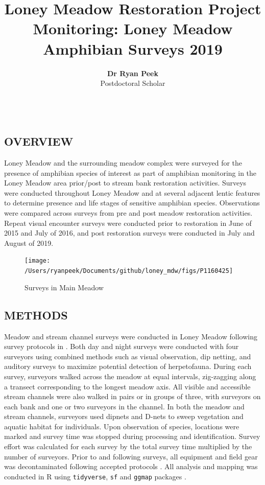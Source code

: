 \documentclass[11pt,a4paper,]{article}
\title{Loney Meadow Restoration Project Monitoring: Loney Meadow Amphibian Surveys 2019}
\author{\sf\Large\textbf{ Dr Ryan Peek}\\ {\sf\large Postdoctoral Scholar\\[0.5cm]}}
\date{\sf\Date~\Month~\Year}
\makeatletter
\def\titlepage{\front{\expandafter{\@title}}{\@author}{\@organization}}
\makeatother
\begin{document}
\titlepage

\hypertarget{overview}{%
\subsection{OVERVIEW}\label{overview}}

Loney Meadow and the surrounding meadow complex were surveyed for the presence of amphibian species of interest as part of amphibian monitoring in the Loney Meadow area prior/post to stream bank restoration activities. Surveys were conducted throughout Loney Meadow and at several adjacent lentic features to determine presence and life stages of sensitive amphibian species. Observations were compared across surveys from pre and post meadow restoration activities. Repeat visual encounter surveys were conducted prior to restoration in June of 2015 and July of 2016, and post restoration surveys were conducted in July and August of 2019.

\begin{figure}

{\centering \texttt{[image: /Users/ryanpeek/Documents/github/loney\_mdw/figs/P1160425]} 

}

\caption{Surveys in Main Meadow}\label{fig:fig1}
\end{figure}

\hypertarget{methods}{%
\subsection{METHODS}\label{methods}}

Meadow and stream channel surveys were conducted in Loney Meadow following survey protocols in \textcite{Heyer1994-dr}. Both day and night surveys were conducted with four surveyors using combined methods such as visual observation, dip netting, and auditory surveys to maximize potential detection of herpetofauna. During each survey, surveyors walked across the meadow at equal intervals, zig-zagging along a transect corresponding to the longest meadow axis. All visible and accessible stream channels were also walked in pairs or in groups of three, with surveyors on each bank and one or two surveyors in the channel. In both the meadow and stream channels, surveyors used dipnets and D-nets to sweep vegetation and aquatic habitat for individuals. Upon observation of species, locations were marked and survey time was stopped during processing and identification. Survey effort was calculated for each survey by the total survey time multiplied by the number of surveyors. Prior to and following surveys, all equipment and field gear was decontaminated following accepted protocols \autocite{Daszak2001-in,Johnson2003-yc,Phillott2010-mt}. All analysis and mapping was conducted in R using \texttt{tidyverse}, \texttt{sf} and \texttt{ggmap} packages \autocite{Kahle2013-rh,Pebesma2018-vd,R_Core_Team2019-pk,Wickham2019-zw}.
\end{document}
